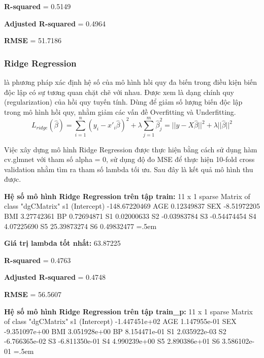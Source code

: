 \documentclass[runningheads]{llncs}
\newenvironment{lcverbatim}
 {\SaveVerbatim{cverb}}
 {\endSaveVerbatim
  \flushleft\fboxrule=0pt\fboxsep=.5em
  \colorbox{cverbbg}{%
    \makebox[\dimexpr\linewidth-2\fboxsep][l]{\BUseVerbatim{cverb}}%
  }
  \endflushleft
}
\begin{document}
\textbf{R-squared} = 0.5149

\textbf{Adjusted R-squared} = 0.4964

\textbf{RMSE} = 51.7186

\subsubsection{Ridge Regression}
là phương pháp xác định hệ số của mô hình hồi quy đa biến trong điều kiện biến độc lập có sự tương quan chặt chẽ với nhau. Được xem là dạng chính quy (regularization) của hồi quy tuyến tính. Dùng để giảm số lượng biến độc lập trong mô hình hồi quy, nhằm giảm các vấn đề Overfitting và Underfitting.
	\begin{equation}
	L_{ridge}(\hat{\beta})=\sum^{n}_{i=1}{(y_i-x'_i\hat{\beta})^2}+\lambda\sum^{m}_{j=1}{\hat{\beta}^2_j}=||y-X\hat{\beta}||^2+\lambda||\hat{\beta}||^2
	\end{equation}

Việc xây dựng mô hình Ridge Regression được thực hiện bằng cách sử dụng hàm cv.glmnet với tham số alpha = 0, sử dụng độ đo MSE để thực hiện 10-fold cross validation nhằm tìm ra tham số lambda tối ưu. Sau đây là kết quả mô hình thu được.

\vspace{0.5cm}
\textbf{Hệ số mô hình Ridge Regression trên tập train:}
\begin{lcverbatim}
11 x 1 sparse Matrix of class "dgCMatrix"
                       s1
(Intercept) -148.67220469
AGE            0.12349837
SEX           -8.51972205
BMI            3.27742361
BP             0.72694871
S1             0.02000633
S2            -0.03983784
S3            -0.54474454
S4             4.07225690
S5            25.39873274
S6             0.49832477
\end{lcverbatim}

\textbf{Giá trị lambda tốt nhất:} 63.87225

\textbf{R-squared} = 0.4763

\textbf{Adjusted R-squared} = 0.4748

\textbf{RMSE} = 56.5607

\vspace{0.5cm}
\textbf{Hệ số mô hình Ridge Regression trên tập train\_p:}
\begin{lcverbatim}
11 x 1 sparse Matrix of class "dgCMatrix"
                       s1
(Intercept) -1.447451e+02
AGE          1.147955e-01
SEX         -9.351097e+00
BMI          3.051928e+00
BP           8.154471e-01
S1           2.035922e-03
S2          -6.766365e-02
S3          -6.811350e-01
S4           4.990239e+00
S5           2.890386e+01
S6           3.586102e-01
\end{lcverbatim}
\end{document}
